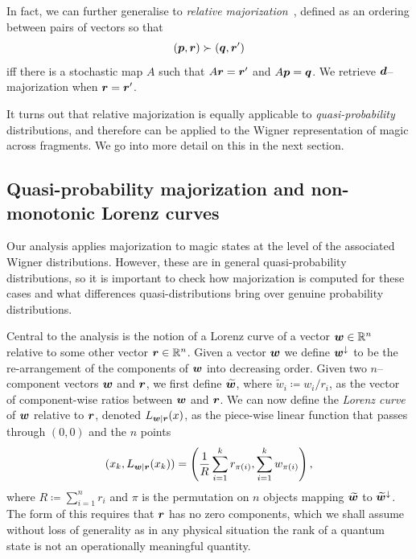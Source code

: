 \documentclass[pra,
aps,
twocolumn,
superscriptaddress,
groupedaddress,
nofootinbib,
reprint
]{revtex4-1}
\begin{document}
In fact, we can further generalise to \emph{relative majorization}~\cite{Ruch_1976, ruch_mixing_1978, Renes_2016, Buscemi_2017}, defined as an ordering between pairs of vectors so that 
\begin{equation}
	(\boldsymbol{p},\boldsymbol{r}) \succ (\boldsymbol{q}, \boldsymbol{r}')
\end{equation}
iff there is a stochastic map $A$ such that $A\boldsymbol{r} = \boldsymbol{r}'$ and $A\boldsymbol{p} = \boldsymbol{q}$. We retrieve $\bm{d}$--majorization when $\boldsymbol{r} = \boldsymbol{r}'$.

It turns out that relative majorization is equally applicable to \emph{quasi-probability} distributions, and therefore can be applied to the Wigner representation of magic across fragments. We go into more detail on this in the next section.

\subsection{Quasi-probability majorization and non-monotonic Lorenz curves}
\label{sec:lc}

Our analysis applies majorization to magic states at the level of the associated Wigner distributions. However, these are in general quasi-probability distributions, so it is important to check how majorization is computed for these cases and what differences quasi-distributions bring over genuine probability distributions.

Central to the analysis is the notion of a Lorenz curve of a vector $\boldsymbol{w} \in \mathbb{R}^n$ relative to some other vector $\boldsymbol{r} \in \mathbb{R}^n$. Given a vector $\boldsymbol{w}$ we define $\boldsymbol{w}^\downarrow$ to be the re-arrangement of the components of $\boldsymbol{w}$ into decreasing order. Given two $n$--component vectors $\boldsymbol{w}$ and $\boldsymbol{r}$, we first define $\widetilde{\boldsymbol{w}}$, where $\widetilde{w}_i \coloneqq w_i/r_i$, as the vector of component-wise ratios between $\boldsymbol{w}$ and $\boldsymbol{r}$.
We can now define the \emph{Lorenz curve} of $\boldsymbol{w}$ relative to $\boldsymbol{r}$, denoted $L_{\boldsymbol{w}|\boldsymbol{r}}(x)$, as the piece-wise linear function that passes through $(0,0)$ and the $n$ points
\begin{equation}
\label{eq:lc}
        (x_k,L_{\boldsymbol{w}|\boldsymbol{r}}(x_k)) =\left( \frac{1}{R}\sum_{i=1}^k r_{\pi(i)}, \sum_{i=1}^k w_{\pi(i)} \right),
\end{equation}
where $R\coloneqq \sum_{i=1}^n r_i$ and $\pi$ is the permutation on $n$ objects mapping $\widetilde{\boldsymbol{w}}$ to $\widetilde{\boldsymbol{w}}^{\downarrow}$. The form of this requires that $\boldsymbol{r}$ has no zero components, which we shall assume without loss of generality as in any physical situation the rank of a quantum state is not an operationally meaningful quantity.
\end{document}
